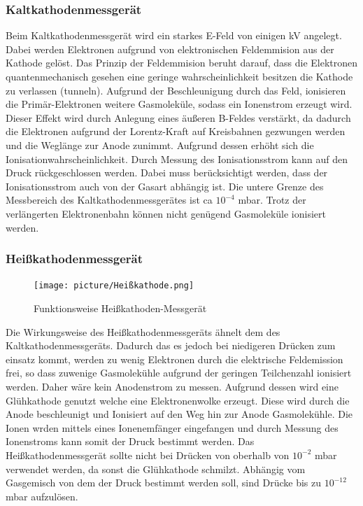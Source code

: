 \subsubsection{Kaltkathodenmessgerät}
Beim Kaltkathodenmessgerät wird ein starkes E-Feld von einigen kV angelegt. Dabei werden Elektronen aufgrund von elektronischen Feldemmision aus der Kathode gelöst. Das Prinzip der Feldemmision beruht darauf, dass die Elektronen quantenmechanisch gesehen eine geringe wahrscheinlichkeit besitzen die Kathode zu verlassen (tunneln). Aufgrund der Beschleunigung durch das Feld, ionisieren die Primär-Elektronen weitere Gasmoleküle, sodass ein Ionenstrom erzeugt wird. Dieser Effekt wird durch Anlegung eines äußeren B-Feldes verstärkt, da dadurch die Elektronen aufgrund der Lorentz-Kraft auf Kreisbahnen gezwungen werden und die Weglänge zur Anode zunimmt. Aufgrund dessen erhöht sich die Ionisationwahrscheinlichkeit. Durch Messung des Ionisationsstrom kann auf den Druck rückgeschlossen werden. Dabei muss berücksichtigt werden, dass der Ionisationsstrom auch von der Gasart abhängig ist. Die untere Grenze des Messbereich des Kaltkathodenmessgerätes ist ca $10^{-4}$ mbar. Trotz der verlängerten Elektronenbahn können nicht genügend Gasmoleküle ionisiert werden.

\subsubsection{Heißkathodenmessgerät}
\begin{figure}
  \vspace{-1.0cm}
  \centering
  \texttt{[image: picture/Heißkathode.png]}
  \caption{Funktionsweise Heißkathoden-Messgerät \cite{Heiss}}
  \label{fig:Heißkathode}
  \vspace{-1.2cm}
\end{figure}
Die Wirkungsweise des Heißkathodenmessgeräts ähnelt dem des Kaltkathodenmessgeräts. Dadurch das es jedoch bei niedigeren Drücken zum einsatz kommt, werden zu wenig Elektronen durch die elektrische Feldemission frei, so dass zuwenige Gasmolekühle aufgrund der geringen Teilchenzahl ionisiert werden. Daher wäre kein Anodenstrom zu messen. Aufgrund dessen wird eine Glühkathode genutzt welche eine Elektronenwolke erzeugt. Diese wird durch die Anode beschleunigt und Ionisiert auf den Weg hin zur Anode Gasmolekühle. Die Ionen wrden mittels eines Ionenemfänger eingefangen und durch Messung des Ionenstroms kann somit der Druck bestimmt werden. Das Heißkathodenmessgerät sollte nicht bei Drücken von oberhalb von $10^{-2}$ mbar verwendet werden, da sonst die Glühkathode schmilzt. Abhängig vom Gasgemisch von dem der Druck bestimmt werden soll, sind Drücke bis zu $10^{-12}$ mbar aufzulösen.
